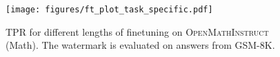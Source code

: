 \begin{figure}[!t]
    \centering
    \texttt{[image: figures/ft\_plot\_task\_specific.pdf]}
    \caption{TPR for different lengths of finetuning on \textsc{OpenMathInstruct} (Math). The watermark is evaluated on answers from GSM-8K.}
    \label{fig:ft_tpr_matheval}
    \vspace{-0.2em}
\end{figure}
